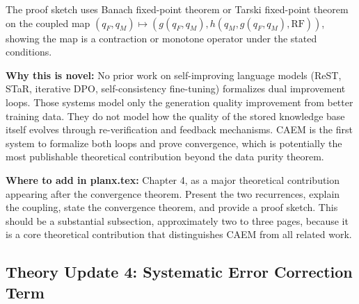 \documentclass[11pt,a4paper]{article}
\begin{document}
{The proof sketch uses Banach fixed-point theorem or Tarski fixed-point theorem on the coupled map $(q_F, q_M) \mapsto (g(q_F, q_M), h(q_M, g(q_F, q_M), \text{RF}))$, showing the map is a contraction or monotone operator under the stated conditions.

\textbf{Why this is novel:} No prior work on self-improving language models (ReST, STaR, iterative DPO, self-consistency fine-tuning) formalizes dual improvement loops. Those systems model only the generation quality improvement from better training data. They do not model how the quality of the stored knowledge base itself evolves through re-verification and feedback mechanisms. CAEM is the first system to formalize both loops and prove convergence, which is potentially the most publishable theoretical contribution beyond the data purity theorem.

\textbf{Where to add in planx.tex:} Chapter 4, as a major theoretical contribution appearing after the convergence theorem. Present the two recurrences, explain the coupling, state the convergence theorem, and provide a proof sketch. This should be a substantial subsection, approximately two to three pages, because it is a core theoretical contribution that distinguishes CAEM from all related work.
}

\subsection{Theory Update 4: Systematic Error Correction Term}
\end{document}
